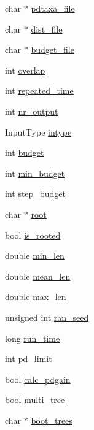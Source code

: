\begin{DoxyCompactItemize}
\item 
char $\ast$ \hyperlink{structParams_ab6f02cc1e64ce54975e3ce1086ee0519}{pdtaxa\_\-file}
\item 
char $\ast$ \hyperlink{structParams_ae8c3ff238e4cf8e20c1d00304f45df9f}{dist\_\-file}
\item 
char $\ast$ \hyperlink{structParams_a256c00c33ab2ce34c017b8e2110c53cc}{budget\_\-file}
\item 
int \hyperlink{structParams_af327f4f532c8cf4ec6867ccfbdc5fc9e}{overlap}
\item 
int \hyperlink{structParams_a7b77c9978a0a9763650a583363edb858}{repeated\_\-time}
\item 
int \hyperlink{structParams_a0a642b128382191a7b873cff928bcbdc}{nr\_\-output}
\item 
InputType \hyperlink{structParams_a3a37fea06df61c82fc8079ed54256d21}{intype}
\item 
int \hyperlink{structParams_a9d6288f6b41f2be731b7250dbc7cf6df}{budget}
\item 
int \hyperlink{structParams_a079ae51c87f97bfe3e2b4aa3551f673e}{min\_\-budget}
\item 
int \hyperlink{structParams_aa1f16d303940a9d714226c8b8daab901}{step\_\-budget}
\item 
char $\ast$ \hyperlink{structParams_ac7f6d239858b254af5c9dafdd2595803}{root}
\item 
bool \hyperlink{structParams_a31427c957607da1fda1078a5dfcc198e}{is\_\-rooted}
\item 
double \hyperlink{structParams_aacbf6830829833568038fa4731d348a9}{min\_\-len}
\item 
double \hyperlink{structParams_ae0161060ce510ef5c0d4c190f04d612a}{mean\_\-len}
\item 
double \hyperlink{structParams_a48436529adb1e9fae4e7fc3ff0a7b7e9}{max\_\-len}
\item 
unsigned int \hyperlink{structParams_ae2b98e7ce38bfbbc6ceb4ab2bcb89d1a}{ran\_\-seed}
\item 
long \hyperlink{structParams_a6bbf50b9c4d395aa45bc32030a7c5470}{run\_\-time}
\item 
int \hyperlink{structParams_a8efb97f088befdd78725c209ed9dbe03}{pd\_\-limit}
\item 
bool \hyperlink{structParams_a2131820dbdf84b690e9ba5459bc4cec8}{calc\_\-pdgain}
\item 
bool \hyperlink{structParams_a3d87d2c85fac27e211f2877ba5f48d76}{multi\_\-tree}
\item 
char $\ast$ \hyperlink{structParams_aa62c599d6c296704df86389b6be31cba}{boot\_\-trees}

\end{DoxyCompactItemize}
